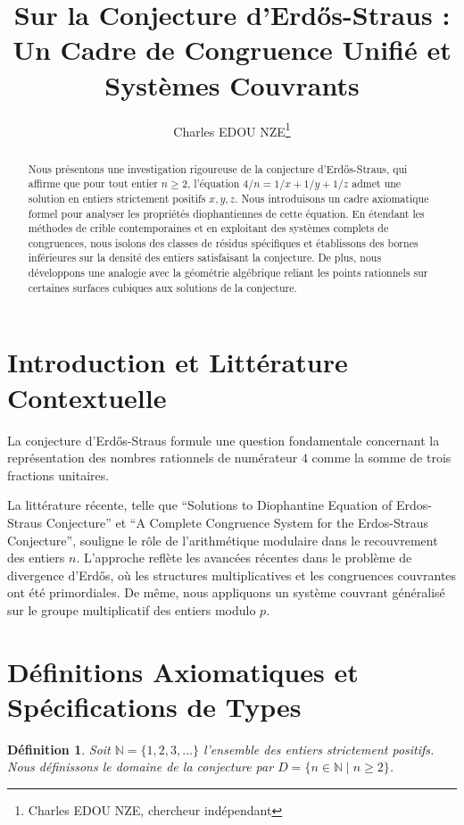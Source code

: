 \documentclass[12pt,a4paper]{article}
\title{Sur la Conjecture d'Erd\H{o}s-Straus : Un Cadre de Congruence Unifié et Systèmes Couvrants}
\author{Charles EDOU NZE\thanks{Charles EDOU NZE, chercheur indépendant}}
\date{}
\newtheorem{definition}[theorem]{Définition}
\begin{document}
\maketitle

\begin{abstract}
Nous présentons une investigation rigoureuse de la conjecture d'Erd\H{o}s-Straus, qui affirme que pour tout entier $n \ge 2$, l'équation $4/n = 1/x + 1/y + 1/z$ admet une solution en entiers strictement positifs $x, y, z$. Nous introduisons un cadre axiomatique formel pour analyser les propriétés diophantiennes de cette équation. En étendant les méthodes de crible contemporaines et en exploitant des systèmes complets de congruences, nous isolons des classes de résidus spécifiques et établissons des bornes inférieures sur la densité des entiers satisfaisant la conjecture. De plus, nous développons une analogie avec la géométrie algébrique reliant les points rationnels sur certaines surfaces cubiques aux solutions de la conjecture.
\end{abstract}

\section{Introduction et Littérature Contextuelle}
La conjecture d'Erd\H{o}s-Straus formule une question fondamentale concernant la représentation des nombres rationnels de numérateur $4$ comme la somme de trois fractions unitaires.

La littérature récente, telle que ``Solutions to Diophantine Equation of Erdos-Straus Conjecture'' et ``A Complete Congruence System for the Erdos-Straus Conjecture'', souligne le rôle de l'arithmétique modulaire dans le recouvrement des entiers $n$. L'approche reflète les avancées récentes dans le problème de divergence d'Erd\H{o}s, où les structures multiplicatives et les congruences couvrantes ont été primordiales. De même, nous appliquons un système couvrant généralisé sur le groupe multiplicatif des entiers modulo $p$.

\section{Définitions Axiomatiques et Spécifications de Types}

\begin{definition}
Soit $\mathbb{N} = \{1, 2, 3, \dots \}$ l'ensemble des entiers strictement positifs. Nous définissons le domaine de la conjecture par $D = \{n \in \mathbb{N} \mid n \ge 2\}$.
\end{definition}
\end{document}
